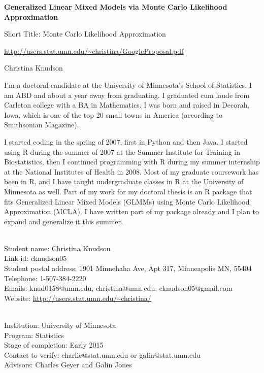 \documentclass[12pt]{article}
\author{}
\date{}
\begin{document}
 \centerline{\large \bf Generalized Linear Mixed Models via Monte Carlo Likelihood Approximation}
 
 \centerline{\large  Short Title: Monte Carlo Likelihood Approximation}
 
 \centerline{ \url{http://users.stat.umn.edu/~christina/GoogleProposal.pdf}}
 \centerline{Christina Knudson}
 \medskip
 

I'm a doctoral candidate at the University of Minnesota's School of Statistics.  I am ABD and about a year away from graduating.  I graduated cum laude from Carleton college with a BA in Mathematics.  I was born and raised in Decorah, Iowa, which is one of the top 20 small towns in America (according to Smithsonian Magazine).  

I started coding in the spring of 2007, first in Python and then Java. I started using R during the summer of 2007 at the Summer Institute for Training in Biostatistics, then I continued programming with R during my summer internship at the National Institutes of Health in 2008.  Most of my graduate coursework has been in R, and I have taught undergraduate classes in R at the University of Minnesota as well.  Part of my work for my doctoral thesis is an R package that fits Generalized Linear Mixed Models (GLMMs) using Monte Carlo Likelihood Approximation (MCLA).  I have written part of my package already and I plan to expand and generalize it this summer.
 \medskip

\\
Student name: Christina Knudson\\
Link id: cknudson05\\
Student postal address: 1901 Minnehaha Ave, Apt 317, Minneapolis MN, 55404\\
Telephone: 1-507-384-2220\\
Emails: knud0158@umn.edu, christina@umn.edu, cknudson05@gmail.com\\
Website: \url{http://users.stat.umn.edu/~christina/}
 \medskip

\\
Institution: University of Minnesota\\
Program: Statistics \\
Stage of completion: Early 2015 \\
Contact to verify: charlie@stat.umn.edu or galin@stat.umn.edu\\
Advisors: Charles Geyer and Galin Jones
 \medskip
\end{document}
